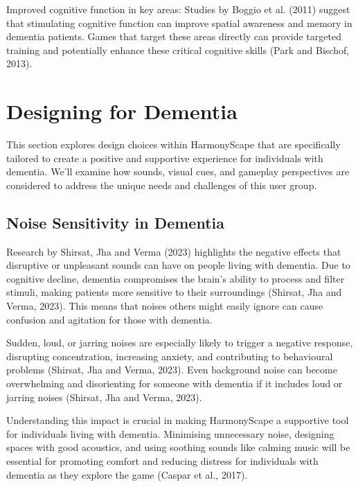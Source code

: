 \documentclass{l4proj}
\begin{document}
Improved cognitive function in key areas: Studies by Boggio et al. (2011) suggest that stimulating cognitive function can improve spatial awareness and memory in dementia patients. Games that target these areas directly can provide targeted training and potentially enhance these critical cognitive skills (Park and Bischof, 2013).

\section{Designing for Dementia}
This section explores design choices within HarmonyScape that are specifically tailored to create a positive and supportive experience for individuals with dementia. We'll examine how sounds, visual cues, and gameplay perspectives are considered to address the unique needs and challenges of this user group.

\subsection{Noise Sensitivity in Dementia}\label{sec:noise_sensitivity}
Research by Shirsat, Jha and Verma (2023) highlights the negative effects that disruptive or unpleasant sounds can have on people living with dementia. Due to cognitive decline, dementia compromises the brain's ability to process and filter stimuli, making patients more sensitive to their surroundings (Shirsat, Jha and Verma, 2023). This means that noises others might easily ignore can cause confusion and agitation for those with dementia.

Sudden, loud, or jarring noises are especially likely to trigger a negative response, disrupting concentration, increasing anxiety, and contributing to behavioural problems (Shirsat, Jha and Verma, 2023). Even background noise can become overwhelming and disorienting for someone with dementia if it includes loud or jarring noises (Shirsat, Jha and Verma, 2023).

Understanding this impact is crucial in making HarmonyScape a supportive tool for individuals living with dementia. Minimising unnecessary noise, designing spaces with good acoustics, and using soothing sounds like calming music will be essential for promoting comfort and reducing distress for individuals with dementia as they explore the game (Caspar et al., 2017).
\end{document}

